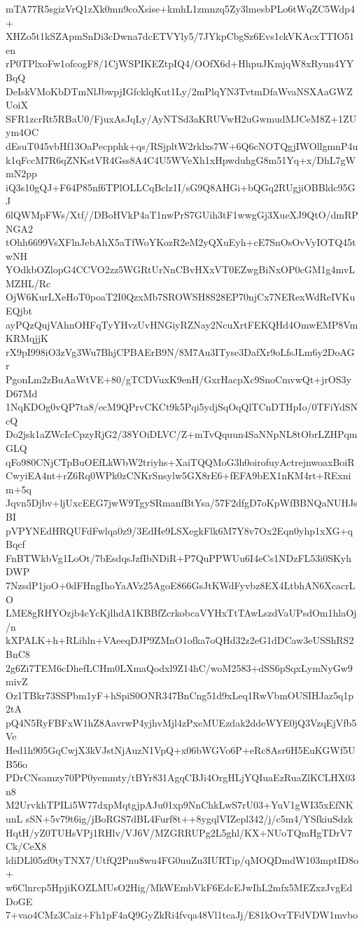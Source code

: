 mTA77R5sgizVrQ1zXk0mn9coXsise+kmhL1zmnzq5Zy3lmesbPLo6tWqZC5Wdp4+
XHZo5t1kSZApmSnDi3cDwna7dcETVYly5/7JYkpCbgSz6Evs1ckVKAcxTTIO51en
rP0TPlxoFw1ofcogF8/1CjWSPIKEZtpIQ4/OOfX6d+HhpuJKmjqW8xRyun4YYBqQ
DeIskVMoKbDTmNlJbwpjIGfcklqKut1Ly/2mPlqYN3TvtmDfaWvaNSXAaGWZUoiX
SFR1zcrRt5RBaU0/FjuxAsJqLy/AyNTSd3aKRUVwH2uGwmudMJCeM8Z+1ZUym4OC
dEsuT045vbHf13OaPecpphk+qs/RSjpltW2rklxs7W+6Q6cNOTQgjIWOllgmnP4u
k1qFccM7R6qZNKstVR4Gss8A4C4U5WVeXh1xHpwduhgG8m51Yq+x/DhL7gWmN2pp
iQ3s10gQJ+F64P85nf6TPlOLLCqBclz1I/sG9Q8AHGi+bQGq2RUgjiOBBldc95GJ
6lQWMpFWs/Xtf//DBoHVkP4aT1nwPrS7GUih3tF1wwgGj3XueXJ9QtO/dmRPNGA2
tOhh6699VsXFlnJebAhX5aTfWoYKozR2eM2yQXuEyh+cE7SnOsOvVyIOTQ45twNH
YOdkbOZlopG4CCVO2zz5WGRtUrNnCBvHXxVT0EZwgBiNxOP0cGM1g4mvLMZHL/Rc
OjW6KurLXeHoT0poaT2I0QzxMb7SROWSH8S28EP70njCx7NERexWdReIVKuEQjbt
ayPQzQujVAhnOHFqTyYHvzUvHNGiyRZNay2NcuXrtFEKQHd4OmwEMP8VmKRMqjjK
rX9pI998iO3zVg3Wu7BhjCPBAErB9N/8M7Au3ITyse3DafXr9oLfsJLm6y2DoAGr
PgonLm2zBuAaWtVE+80/gTCDVuxK9enH/GxrHacpXc9SnoCmvwQt+jrOS3yD67Md
1NqKDOg0vQP7ta8/ecM9QPrvCKCt9k5Pqi5ydjSqOqQlTCnDTHpIo/0TFiYdSNcQ
Do2jsk1aZWcIcCpzyRjG2/38YOiDLVC/Z+mTvQquun4SaNNpNL8tObrLZHPqmGLQ
qFo980CNjCTpBuOEfLkWbW2triyhs+XaiTQQMoG3h0oirofuyActrejnwoaxBoiR
CwyiEA4nt+rZ6Rq0WPk0zCNKrSnsylw5GX8rE6+fEFA9bEX1nKM4rt+RExnim+5q
Jqvn5Djbv+ljUxcEEG7jwW9TgySRmanfBtYsa/57F2dfgD7oKpWfBBNQaNUHJsBI
pVPYNEdHRQUFdFwlqa0z9/3EdHe9LSXegkFlk6M7Y8v7Ox2Eqn0yhp1xXG+qBqcf
FnBTWkbVg1LoOt/7bEsdqsJzfIbNDiR+P7QuPPWUu6I4eCs1NDzFL53i0SKyhDWP
7NzsdP1joO+0dFHngIhoYaAVz25AgoE866GsJtKWdFyvbz8EX4LtbhAN6XcacrLO
LME8gRHYOzjb4cYcKjlhdA1KBBfZcrkobcaVYHxTtTAwLszdVaUPsdOm1hlaOj/n
kXPALK+h+RLihln+VAeeqDJP9ZMnO1ofka7oQHd32z2eG1dDCaw3eUSShRS2BnC8
2g6Zi7TEM6cDhefLCHm0LXmaQodxl9Z14hC/woM2583+dSS6pSqxLymNyGw9mivZ
Oz1TBkr73SSPbm1yF+hSpiS0ONR347BnCng51d9xLeq1RwVbmOUSIHJaz5q1p2tA
pQ4N5RyFBFxW1hZ8AavrwP4yjhvMjl4zPxeMUEzdak2ddeWYE0jQ3VzqEjVfb5Ve
Hed1h905GqCwjX3kVJstNjAuzN1VpQ+x06bWGVo6P+eRc8Asr6H5EuKGWf5UB56o
PDrCNsamzy70PP0yemmty/tBYr831AgqCBJi4OrgHLjYQIuaEzRuaZlKCLHX03n8
M2UrvkhTPILi5W77dxpMqtgjpAJu01xp9NnChkLwS7rU03+YuV1gWI35xEfNKunL
sSN+5v79t6ig/jBoRGS7dBL4Furf8t++8ygqlVIZepl342/j/c5m4/YSfkiuSdzk
HqtH/yZ0TUHsVPj1RHlv/VJ6V/MZGRRUPg2L5ghl/KX+NUoTQmHgTDrV7Ck/CeX8
ldiDLl05zf0tyTNX7/UtfQ2Pnu8wu4FG0uuZu3IURTip/qMOQDmdW103mptID8o+
w6Clnrcp5HpjiKOZLMUsO2Hig/MkWEmbVkF6EdcEJwIhL2mfx5MEZxzJvgEdDoGE
7+vao4CMz3Caiz+Fh1pF4aQ9GyZkRi4fvqa48Vl1tcaJj/E81kOvrTFdVDW1mvbo
